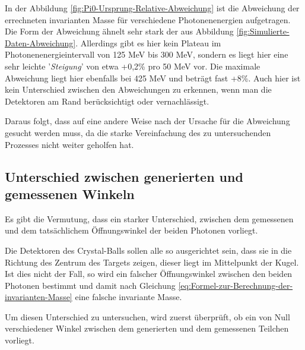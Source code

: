 \documentclass[a4paper,11pt,oneside,final,german,openbib,pdftex]{scrbook}
\begin{document}
{In der Abbildung \ref{fig:Pi0-Ursprung-Relative-Abweichung} ist die Abweichung der errechneten invarianten Masse für verschiedene Photonenenergien aufgetragen. Die Form der Abweichung ähnelt sehr stark der aus Abbildung \ref{fig:Simulierte-Daten-Abweichung}.
 Allerdings gibt es hier kein Plateau im Photonenenergieintervall von 125 MeV bis 300 MeV, sondern es liegt hier eine sehr leichte '\textit{Steigung}' von etwa +0,2\% pro 50 MeV vor. Die maximale Abweichung liegt hier ebenfalls bei 425 MeV und betr\"agt fast +8\%. Auch hier ist kein Unterschied zwischen den Abweichungen zu erkennen, wenn man die Detektoren am Rand berücksichtigt oder vernachlässigt. 

Daraus folgt, dass auf eine andere Weise nach der Ursache für die Abweichung gesucht werden muss, da die starke Vereinfachung des zu untersuchenden Prozesses nicht weiter geholfen hat.


\subsection{Unterschied zwischen generierten und gemessenen Winkeln}
\label{sec:Unterschied-tatsaechlicher-gemessener-Winkel}

Es gibt die Vermutung, dass ein starker Unterschied, zwischen dem gemessenen und dem tatsächlichem Öffnungswinkel der beiden Photonen vorliegt.

Die Detektoren des Crystal-Balls sollen alle so ausgerichtet sein, dass sie in die Richtung des Zentrum des Targets zeigen, dieser liegt im Mittelpunkt der Kugel. Ist dies nicht der Fall, so wird ein falscher Öffnungswinkel zwischen den beiden Photonen bestimmt und damit nach Gleichung \ref{eq:Formel-zur-Berechnung-der-invarianten-Masse} eine falsche invariante Masse.

Um diesen Unterschied zu untersuchen, wird zuerst überprüft, ob ein von Null verschiedener Winkel zwischen dem generierten und dem gemessenen Teilchen vorliegt.

}
\end{document}
